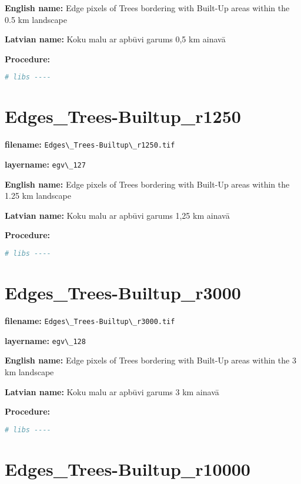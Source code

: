 \documentclass[
]{book}
\newcommand{\passthrough}[1]{#1}
\begin{document}
\textbf{English name:} Edge pixels of Trees bordering with Built-Up areas within the 0.5 km landscape

\textbf{Latvian name:} Koku malu ar apbūvi garums 0,5 km ainavā

\textbf{Procedure:}

\begin{lstlisting}[language=R]
# libs ----
\end{lstlisting}

\section{Edges\_Trees-Builtup\_r1250}\label{ch06.127}

\textbf{filename:} \passthrough{\lstinline!Edges\_Trees-Builtup\_r1250.tif!}

\textbf{layername:} \passthrough{\lstinline!egv\_127!}

\textbf{English name:} Edge pixels of Trees bordering with Built-Up areas within the 1.25 km landscape

\textbf{Latvian name:} Koku malu ar apbūvi garums 1,25 km ainavā

\textbf{Procedure:}

\begin{lstlisting}[language=R]
# libs ----
\end{lstlisting}

\section{Edges\_Trees-Builtup\_r3000}\label{ch06.128}

\textbf{filename:} \passthrough{\lstinline!Edges\_Trees-Builtup\_r3000.tif!}

\textbf{layername:} \passthrough{\lstinline!egv\_128!}

\textbf{English name:} Edge pixels of Trees bordering with Built-Up areas within the 3 km landscape

\textbf{Latvian name:} Koku malu ar apbūvi garums 3 km ainavā

\textbf{Procedure:}

\begin{lstlisting}[language=R]
# libs ----
\end{lstlisting}

\section{Edges\_Trees-Builtup\_r10000}\label{ch06.129}
\end{document}
